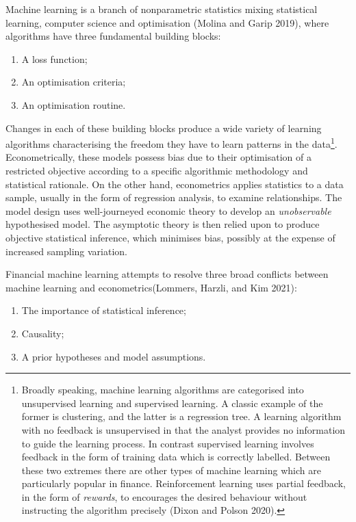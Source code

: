 \documentclass{article}
\begin{document}
Machine learning is a branch of nonparametric statistics mixing
statistical learning, computer science and optimisation (Molina and
Garip 2019), where algorithms have three fundamental building blocks:

\begin{enumerate}
\def\labelenumi{\arabic{enumi}.}
\tightlist
\item
  A loss function;
\item
  An optimisation criteria;
\item
  An optimisation routine.
\end{enumerate}

Changes in each of these building blocks produce a wide variety of
learning algorithms characterising the freedom they have to learn
patterns in the data\footnote{Broadly speaking, machine learning
  algorithms are categorised into unsupervised learning and supervised
  learning. A classic example of the former is clustering, and the
  latter is a regression tree. A learning algorithm with no feedback is
  unsupervised in that the analyst provides no information to guide the
  learning process. In contrast supervised learning involves feedback in
  the form of training data which is correctly labelled. Between these
  two extremes there are other types of machine learning which are
  particularly popular in finance. Reinforcement learning uses partial
  feedback, in the form of \emph{rewards}, to encourages the desired
  behaviour without instructing the algorithm precisely (Dixon and
  Polson 2020).}. Econometrically, these models possess bias due to
their optimisation of a restricted objective according to a specific
algorithmic methodology and statistical rationale. On the other hand,
econometrics applies statistics to a data sample, usually in the form of
regression analysis, to examine relationships. The model design uses
well-journeyed economic theory to develop an \emph{unobservable}
hypothesised model. The asymptotic theory is then relied upon to produce
objective statistical inference, which minimises bias, possibly at the
expense of increased sampling variation.

Financial machine learning attempts to resolve three broad conflicts
between machine learning and econometrics(Lommers, Harzli, and Kim
2021):

\begin{enumerate}
\def\labelenumi{\arabic{enumi}.}
\tightlist
\item
  The importance of statistical inference;
\item
  Causality;
\item
  A prior hypotheses and model assumptions.
\end{enumerate}
\end{document}
